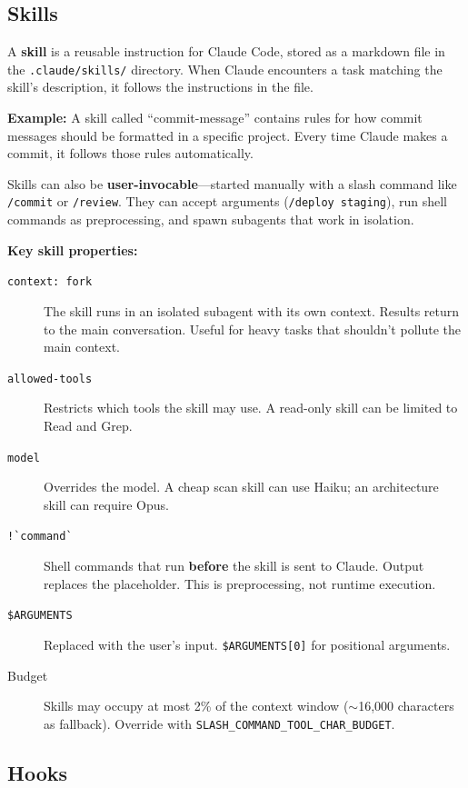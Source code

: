 \documentclass[11pt,a4paper]{article}
\begin{document}
\subsection{Skills}
\label{sec:skills}

A \textbf{skill} is a reusable instruction for Claude Code, stored as a markdown file in the \texttt{.claude/skills/} directory. When Claude encounters a task matching the skill's description, it follows the instructions in the file.

\textbf{Example:} A skill called ``commit-message'' contains rules for how commit messages should be formatted in a specific project. Every time Claude makes a commit, it follows those rules automatically.

Skills can also be \textbf{user-invocable}---started manually with a slash command like \texttt{/commit} or \texttt{/review}. They can accept arguments (\texttt{/deploy staging}), run shell commands as preprocessing, and spawn subagents that work in isolation.

\textbf{Key skill properties:}
\begin{description}
  \item[\texttt{context: fork}] The skill runs in an isolated subagent with its own context. Results return to the main conversation. Useful for heavy tasks that shouldn't pollute the main context.
  \item[\texttt{allowed-tools}] Restricts which tools the skill may use. A read-only skill can be limited to Read and Grep.
  \item[\texttt{model}] Overrides the model. A cheap scan skill can use Haiku; an architecture skill can require Opus.
  \item[\texttt{!\`{}command\`{}}] Shell commands that run \textbf{before} the skill is sent to Claude. Output replaces the placeholder. This is preprocessing, not runtime execution.
  \item[\texttt{\$ARGUMENTS}] Replaced with the user's input. \texttt{\$ARGUMENTS[0]} for positional arguments.
  \item[Budget] Skills may occupy at most 2\% of the context window ($\sim$16,000 characters as fallback). Override with \texttt{SLASH\_COMMAND\_TOOL\_CHAR\_BUDGET}.
\end{description}

\subsection{Hooks}
\label{sec:hooks}
\end{document}

